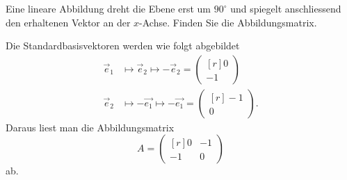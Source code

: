 Eine lineare Abbildung dreht die Ebene erst um $90^\circ$ und spiegelt
anschliessend den erhaltenen Vektor an der $x$-Achse.
Finden Sie die Abbildungsmatrix.

\begin{loesung}
Die Standardbasisvektoren werden wie folgt abgebildet
\begin{align*}
\vec{e}_1
&\mapsto
\vec{e}_2
\mapsto
-\vec{e}_2
=
\begin{pmatrix*}[r]0\\-1\end{pmatrix*}
\\
\vec{e}_2
&\mapsto
-\vec{e_1}
\mapsto
-\vec{e_1}
=
\begin{pmatrix*}[r] -1\\0 \end{pmatrix*}.
\end{align*}
Daraus liest man die Abbildungsmatrix
\[
A
=
\begin{pmatrix*}[r]
 0 & -1\\
-1 &  0
\end{pmatrix*}
\]
ab.
\end{loesung}


